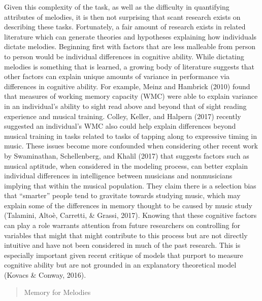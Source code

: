 \documentclass[]{book}
\begin{document}
Given this complexity of the task, as well as the difficulty in quantifying attributes of melodies, it is then not surprising that scant research exists on describing these tasks.
Fortunately, a fair amount of research exists in related literature which can generate theories and hypotheses explaining how individuals dictate melodies.
Beginning first with factors that are less malleable from person to person would be individual differences in cognitive ability.
While dictating melodies is something that is learned, a growing body of literature suggests that other factors can explain
unique amounts of variance in performance via differences in cognitive ability.
For example, Meinz and Hambrick (2010) found that measures of working memory capacity (WMC)
were able to explain variance in an individual's ability to sight read above and beyond that of sight reading experience and
musical training.
Colley, Keller, and Halpern (2017) recently suggested an individual's WMC also could help explain
differences beyond musical training in tasks related to tasks of
tapping along to expressive timing in music.
These issues become more confounded when considering other recent work by Swaminathan, Schellenberg, and Khalil (2017) that suggests factors such as musical aptitude, when considered in the modeling process, can better explain individual differences in intelligence between musicians and nonmusicians implying that within the musical population.
They claim there is a selection bias that ``smarter'' people tend to gravitate towards studying music, which may explain some of the differences in memory thought to be caused by music study (Talamini, Altoè, Carretti, \& Grassi, 2017).
Knowing that these cognitive factors can play a role warrants attention from future researchers on controlling for variables that might that might contribute to this process but are not directly intuitive and have not been considered in much of the past
research.
This is especially important given recent critique of models that purport to measure cognitive ability but are not grounded in an explanatory theoretical model (Kovacs \& Conway, 2016).

\begin{quote}
Memory for Melodies
\end{quote}
\end{document}
